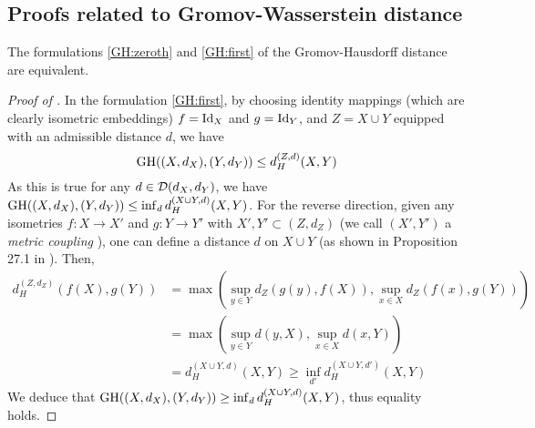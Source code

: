 \subsection{Proofs related to Gromov-Wasserstein distance} \label{subsec:appendix_gw}

\begin{corollary}
  \label{coro:gh_equiv}
    The formulations \eqref{GH:zeroth} and \eqref{GH:first} of the Gromov-Hausdorff distance
    are equivalent.
\end{corollary}
\begin{proof}[Proof of ]
In the formulation \eqref{GH:first}, by choosing identity mappings (which are clearly isometric embeddings)
$f = \text{Id}_X$ and $g = \text{Id}_Y$, and $Z = X \cup Y$ equipped with an admissible distance $d$, we have
\begin{equation}
  \text{GH}((X,d_X), (Y,d_Y)) \leq d_{H}^{(Z,d)}(X, Y)
\end{equation}
As this is true for any $d \in \mathcal D(d_X,d_Y)$, we have
$\text{GH}((X,d_X), (Y,d_Y)) \leq \inf_{d} d_{H}^{(X \cup Y, d)}(X, Y)$. For the reverse direction,
given any isometries $f: X \to X'$ and $g: Y \to Y'$ with $X', Y' \subset (Z, d_Z)$
(we call $(X',Y')$ a \textit{metric coupling} \citep{Villani08}), one can define
a distance $d$ on $X \cup Y$ (as shown in Proposition 27.1 in \citep{Villani08}). Then,
\begin{equation}
  \begin{split}
    d_H^{(Z, d_Z)}(f(X), g(Y)) &=
  \max(\sup_{y \in Y} d_Z(g(y), f(X)), \sup_{x \in X} d_Z(f(x), g(Y))) \\
  &= \max(\sup_{y \in Y} d(y, X), \sup_{x \in X} d(x, Y)) \\
  &= d_H^{(X \cup Y, d)}(X, Y) \geq \inf_{d'} d_{H}^{(X \cup Y, d')}(X, Y)
  \end{split}
\end{equation}
We deduce that $\text{GH}((X,d_X), (Y,d_Y)) \geq \inf_{d} d_{H}^{(X \cup Y, d)}(X, Y)$,
thus equality holds.
\end{proof}

